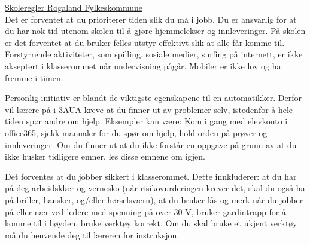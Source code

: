 \documentclass[12pt,a4paper]{article}
\begin{document}
%
%
%
%
%
\href{https://lovdata.no/dokument/LF/forskrift/2024-06-11-1396/KAPITTEL_1#KAPITTEL_1}{Skoleregler Rogaland Fylkeskommune}\\
\vskip 0.5cm
 Det er forventet at du prioriterer tiden slik du må i jobb. Du er ansvarlig for at du har nok tid utenom skolen til å gjøre hjemmelekser og innleveringer. På skolen er det forventet at du bruker felles utstyr effektivt slik at alle får komme til. Forstyrrende aktiviteter, som spilling, sosiale medier, surfing på internett, er ikke akseptert i klasserommet når undervisning pågår. Mobiler er ikke lov og ha fremme i timen. 



\vskip 10pt



\noindent
{} Personlig initiativ er blandt de viktigste egenskapene til en automatikker. Derfor vil lærere på i 3AUA kreve at du finner ut av problemer selv, istedenfor å hele tiden spør andre om hjelp. Eksempler kan være: Kom i gang med elevkonto i office365, sjekk manualer for du spør om hjelp, hold orden på prøver og innleveringer. Om du finner ut at du ikke forstår en oppgave på grunn av at du ikke husker tidligere emner, les disse emnene om igjen. 
\vskip 10pt

\noindent
{} Det forventes at du jobber sikkert i klasserommet. Dette innkluderer: at du har på deg arbeidsklær og vernesko (når risikovurderingen krever det,  skal du også ha på briller, hansker, og/eller hørselsværn), at du bruker lås og merk når du jobber på eller nær ved ledere med spenning på over 30 V, bruker gardintrapp for å komme til i høyden, bruke verktøy korrekt. Om du skal bruke et ukjent verktøy må du henvende deg til læreren for instruksjon. 
\vskip 10pt
\end{document}

